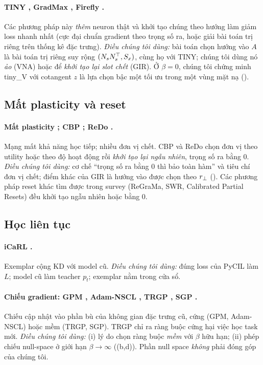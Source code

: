 \paragraph{TINY \cite{verbockhaven2024tiny}, GradMax \cite{evci2022gradmax}, Firefly \cite{wu2020firefly}.} Các phương pháp này \emph{thêm} neuron thật và khởi tạo chúng theo hướng làm giảm loss nhanh nhất (cực đại chuẩn gradient theo trọng số ra, hoặc giải bài toán trị riêng trên thống kê đặc trưng). \emph{Điều chúng tôi dùng:} bài toán chọn hướng vào $A$ là bài toán trị riêng suy rộng $(N_sN_s^{\top},S_x)$, cùng họ với TINY; chúng tôi dùng nó \emph{ảo} (VNA) hoặc để \emph{khởi tạo lại slot chết} (GIR). Ở $\beta=0$, chúng tôi chứng minh tiny\_V với cotangent $z$ là lựa chọn bậc một tối ưu trong một vùng mặt nạ ().

\subsection{Mất plasticity và reset}

\paragraph{Mất plasticity \cite{dohare2024}; CBP \cite{dohare2024}; ReDo \cite{sokar2023redo}.} Mạng mất khả năng học tiếp; nhiều đơn vị chết. CBP và ReDo chọn đơn vị theo utility hoặc theo độ hoạt động rồi \emph{khởi tạo lại ngẫu nhiên}, trọng số ra bằng $0$. \emph{Điều chúng tôi dùng:} cơ chế ``trọng số ra bằng 0 thì bảo toàn hàm'' và tiêu chí đơn vị chết; điểm khác của GIR là hướng vào được chọn theo $r_{\perp}$ (). Các phương pháp reset khác tìm được trong survey (ReGraMa, SWR, Calibrated Partial Resets) đều khởi tạo ngẫu nhiên hoặc bằng $0$.

\subsection{Học liên tục}

\paragraph{iCaRL \cite{rebuffi2017icarl}.} Exemplar cộng KD với model cũ. \emph{Điều chúng tôi dùng:} đúng loss của PyCIL làm $L$; model cũ làm teacher $p_t$; exemplar nằm trong cửa sổ.

\paragraph{Chiếu gradient: GPM \cite{saha2021gpm}, Adam-NSCL \cite{wang2021nscl}, TRGP \cite{lin2022trgp}, SGP \cite{saha2023sgp}.} Chiếu cập nhật vào phần bù của không gian đặc trưng cũ, cứng (GPM, Adam-NSCL) hoặc mềm (TRGP, SGP). TRGP chỉ ra ràng buộc cứng hại việc học task mới. \emph{Điều chúng tôi dùng:} (i) lý do chọn ràng buộc \emph{mềm} với $\beta$ hữu hạn; (ii) phép chiếu null-space ở giới hạn $\beta\to\infty$ ((b,d)). Phần null space \emph{không} phải đóng góp của chúng tôi.

